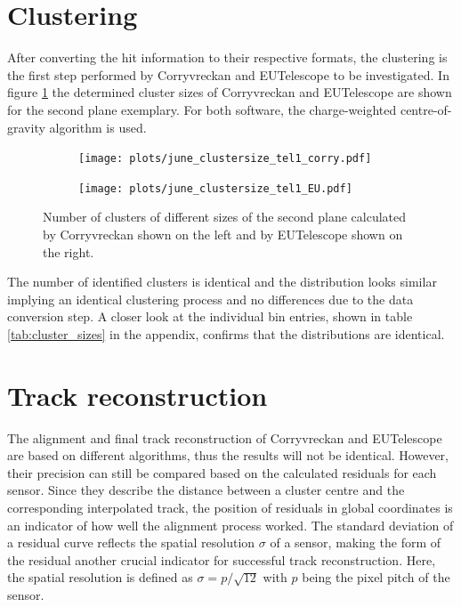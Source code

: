 \section{Clustering}
After converting the hit information to their respective formats, the clustering is the first step performed by Corryvreckan and EUTelescope
to be investigated.
In figure \ref{fig:cluster_size} the determined cluster sizes of Corryvreckan and EUTelescope are shown for the second plane exemplary.
For both software, the charge-weighted centre-of-gravity algorithm is used.

\begin{figure}
  \hspace{-1cm}
  \begin{subfigure}{0.53\textwidth}
      \texttt{[image: plots/june\_clustersize\_tel1\_corry.pdf]}
  \end{subfigure}
  \begin{subfigure}{0.53\textwidth}
      \texttt{[image: plots/june\_clustersize\_tel1\_EU.pdf]}
  \end{subfigure}
  \caption{Number of clusters of different sizes of the second plane calculated by Corryvreckan shown on the left and by EUTelescope shown on the right.}
  \label{fig:cluster_size}
\end{figure}

The number of identified clusters is identical and the distribution looks similar implying an identical clustering process
and no differences due to the data conversion step. A closer look at the individual bin entries, shown in table \ref{tab:cluster_sizes} in the appendix,
confirms that the distributions are identical.

\section{Track reconstruction}
The alignment and final track reconstruction of Corryvreckan and EUTelescope are based on different algorithms, thus the
results will not be identical. However, their precision can still be compared based on the calculated residuals for each sensor.
Since they describe the distance between a cluster centre and the corresponding interpolated track, the position of
residuals in global coordinates is an indicator of how well the alignment process worked. The standard deviation of a
residual curve reflects the spatial resolution $\sigma$ of a sensor, making the form of the residual another crucial indicator
for successful track reconstruction. Here, the spatial resolution is defined as ${\sigma = p/\sqrt{12}}$ with $p$ being the
pixel pitch of the sensor.

